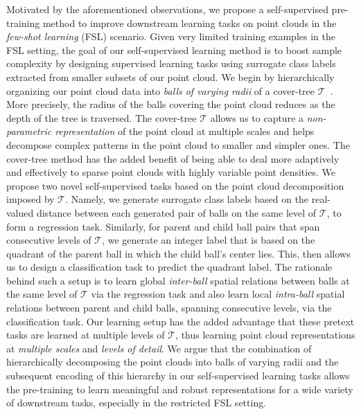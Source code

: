 \documentclass{article}
\newcommand{\mT}{\mathcal{T}}
\begin{document}
Motivated by the aforementioned observations, we propose a self-supervised pre-training method to improve  downstream learning tasks on point clouds in the \emph{few-shot learning} (FSL) scenario.
Given very limited training examples in the FSL setting, the goal of our self-supervised learning method is to boost sample complexity by designing supervised learning tasks using surrogate class labels extracted from smaller subsets of our point cloud. We begin by hierarchically organizing our point cloud data into \emph{balls of varying radii} of a cover-tree $\mT$~\cite{beygelzimer2006cover}. More precisely, the radius of the balls covering the point cloud reduces as the depth of the tree is traversed.
The cover-tree $\mT$ allows us to capture a \emph{non-parametric representation} of the point cloud at multiple scales and helps decompose complex patterns in the point cloud to smaller and simpler ones. 
The cover-tree method has the added benefit of being able to deal more adaptively and effectively to sparse point clouds with highly variable point densities.
We propose two novel self-supervised tasks based on the point cloud decomposition imposed by $\mT$.
Namely, we generate surrogate class labels based on the real-valued distance between each generated pair of balls on the same level of $\mT$, to form a regression task. Similarly, for parent and child ball pairs that 
span consecutive levels of $\mT$, we generate an integer label that is based on the quadrant of the parent ball in which the child ball's center lies. This, then allows us to design a classification task to predict the quadrant label. The rationale behind such a setup is to learn global \emph{inter-ball} spatial relations between balls at the same level of $\mT$ via the regression task and also learn local \emph{intra-ball} spatial relations between parent and child balls, spanning consecutive levels, via the classification task. 
Our learning setup has the added advantage that these pretext tasks are learned at multiple levels of $\mT$, thus learning point cloud representations at \emph{multiple scales} and \emph{levels of detail}. 
We argue that the combination of hierarchically decomposing the point clouds into balls of varying radii and the subsequent encoding of this hierarchy in our self-supervised learning tasks allows the pre-training to learn meaningful and robust representations for a wide variety of downstream tasks, especially in the restricted FSL setting.
\end{document}
